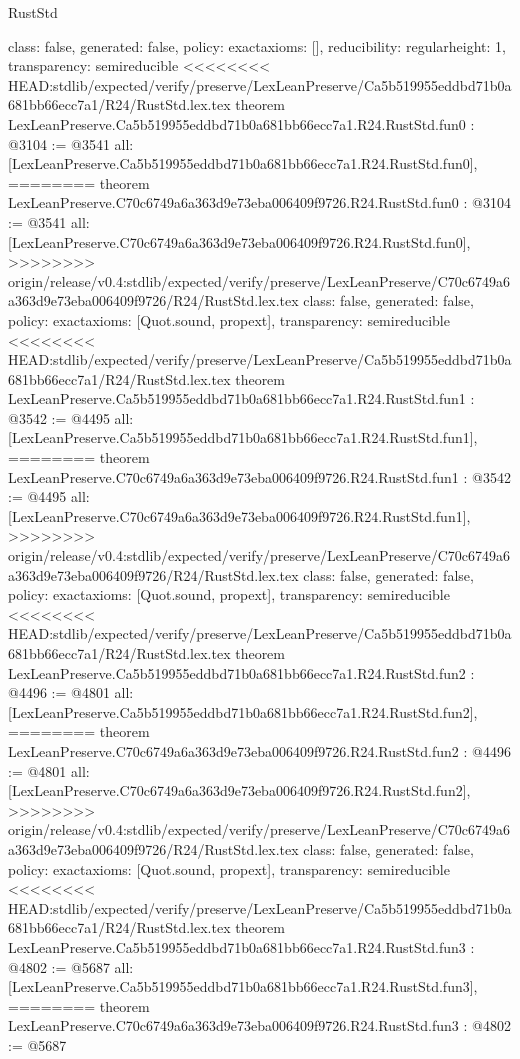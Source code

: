 \begin{lexlean}{RustStd}
\begin{coremodule}
{\begin{coremodule}
{{{  class: false,
  generated: false,
  policy: exact{axioms: []},
  reducibility: regular{height: 1},
  transparency: semireducible
}
<<<<<<<< HEAD:stdlib/expected/verify/preserve/LexLeanPreserve/Ca5b519955eddbd71b0a681bb66ecc7a1/R24/RustStd.lex.tex
theorem LexLeanPreserve.Ca5b519955eddbd71b0a681bb66ecc7a1.R24.RustStd.fun0 : @3104 := @3541 {
  all: [LexLeanPreserve.Ca5b519955eddbd71b0a681bb66ecc7a1.R24.RustStd.fun0],
========
theorem LexLeanPreserve.C70c6749a6a363d9e73eba006409f9726.R24.RustStd.fun0 : @3104 := @3541 {
  all: [LexLeanPreserve.C70c6749a6a363d9e73eba006409f9726.R24.RustStd.fun0],
>>>>>>>> origin/release/v0.4:stdlib/expected/verify/preserve/LexLeanPreserve/C70c6749a6a363d9e73eba006409f9726/R24/RustStd.lex.tex
  class: false,
  generated: false,
  policy: exact{axioms: [Quot.sound, propext]},
  transparency: semireducible
}
<<<<<<<< HEAD:stdlib/expected/verify/preserve/LexLeanPreserve/Ca5b519955eddbd71b0a681bb66ecc7a1/R24/RustStd.lex.tex
theorem LexLeanPreserve.Ca5b519955eddbd71b0a681bb66ecc7a1.R24.RustStd.fun1 : @3542 := @4495 {
  all: [LexLeanPreserve.Ca5b519955eddbd71b0a681bb66ecc7a1.R24.RustStd.fun1],
========
theorem LexLeanPreserve.C70c6749a6a363d9e73eba006409f9726.R24.RustStd.fun1 : @3542 := @4495 {
  all: [LexLeanPreserve.C70c6749a6a363d9e73eba006409f9726.R24.RustStd.fun1],
>>>>>>>> origin/release/v0.4:stdlib/expected/verify/preserve/LexLeanPreserve/C70c6749a6a363d9e73eba006409f9726/R24/RustStd.lex.tex
  class: false,
  generated: false,
  policy: exact{axioms: [Quot.sound, propext]},
  transparency: semireducible
}
<<<<<<<< HEAD:stdlib/expected/verify/preserve/LexLeanPreserve/Ca5b519955eddbd71b0a681bb66ecc7a1/R24/RustStd.lex.tex
theorem LexLeanPreserve.Ca5b519955eddbd71b0a681bb66ecc7a1.R24.RustStd.fun2 : @4496 := @4801 {
  all: [LexLeanPreserve.Ca5b519955eddbd71b0a681bb66ecc7a1.R24.RustStd.fun2],
========
theorem LexLeanPreserve.C70c6749a6a363d9e73eba006409f9726.R24.RustStd.fun2 : @4496 := @4801 {
  all: [LexLeanPreserve.C70c6749a6a363d9e73eba006409f9726.R24.RustStd.fun2],
>>>>>>>> origin/release/v0.4:stdlib/expected/verify/preserve/LexLeanPreserve/C70c6749a6a363d9e73eba006409f9726/R24/RustStd.lex.tex
  class: false,
  generated: false,
  policy: exact{axioms: [Quot.sound, propext]},
  transparency: semireducible
}
<<<<<<<< HEAD:stdlib/expected/verify/preserve/LexLeanPreserve/Ca5b519955eddbd71b0a681bb66ecc7a1/R24/RustStd.lex.tex
theorem LexLeanPreserve.Ca5b519955eddbd71b0a681bb66ecc7a1.R24.RustStd.fun3 : @4802 := @5687 {
  all: [LexLeanPreserve.Ca5b519955eddbd71b0a681bb66ecc7a1.R24.RustStd.fun3],
========
theorem LexLeanPreserve.C70c6749a6a363d9e73eba006409f9726.R24.RustStd.fun3 : @4802 := @5687 {
}}}}}}}
\end{coremodule}}
\end{coremodule}
\end{lexlean}
